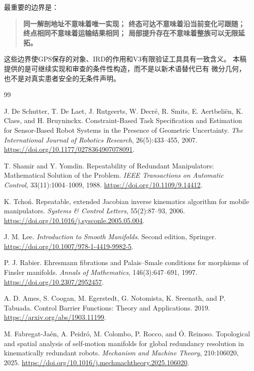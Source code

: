 \documentclass[UTF8,11pt,a4paper,fontset=fandol]{ctexart}
\numberwithin{equation}{section}
\theoremstyle{definition}
\begin{document}
最重要的边界是：
\begin{quote}
\textbf{同一解剖地址不意味着唯一实现；
终态可达不意味着沿当前变化可跟随；
终点相同不意味着运输结果相同；
局部提升存在不意味着整族可以无限延拓。}
\end{quote}

这些边界使GPS保存的对象、IRD的作用和V3有限验证工具具有一致含义。
本稿提供的是可继续实现和审查的条件性构造，而不是以新术语替代已有
微分几何，也不是对真实患者安全的无条件声明。

\begin{thebibliography}{99}

J. De Schutter, T. De Laet, J. Rutgeerts, W. Decré, R. Smits,
E. Aertbeliën, K. Claes, and H. Bruyninckx.
Constraint-Based Task Specification and Estimation for Sensor-Based
Robot Systems in the Presence of Geometric Uncertainty.
\emph{The International Journal of Robotics Research},
26(5):433--455, 2007.
\url{https://doi.org/10.1177/0278364907078091}.

T. Shamir and Y. Yomdin.
Repeatability of Redundant Manipulators: Mathematical Solution of the Problem.
\emph{IEEE Transactions on Automatic Control},
33(11):1004--1009, 1988.
\url{https://doi.org/10.1109/9.14412}.

K. Tchoń.
Repeatable, extended Jacobian inverse kinematics algorithm for mobile manipulators.
\emph{Systems \& Control Letters}, 55(2):87--93, 2006.
\url{https://doi.org/10.1016/j.sysconle.2005.05.004}.

J. M. Lee.
\emph{Introduction to Smooth Manifolds}.
Second edition, Springer.
\url{https://doi.org/10.1007/978-1-4419-9982-5}.

P. J. Rabier.
Ehresmann fibrations and Palais--Smale conditions for morphisms of Finsler manifolds.
\emph{Annals of Mathematics}, 146(3):647--691, 1997.
\url{https://doi.org/10.2307/2952457}.

A. D. Ames, S. Coogan, M. Egerstedt, G. Notomista,
K. Sreenath, and P. Tabuada.
Control Barrier Functions: Theory and Applications.
2019.
\url{https://arxiv.org/abs/1903.11199}.

M. Fabregat-Jaén, A. Peidró, M. Colombo, P. Rocco, and Ó. Reinoso.
Topological and spatial analysis of self-motion manifolds for global
redundancy resolution in kinematically redundant robots.
\emph{Mechanism and Machine Theory}, 210:106020, 2025.
\url{https://doi.org/10.1016/j.mechmachtheory.2025.106020}.


\end{thebibliography}
\end{document}
